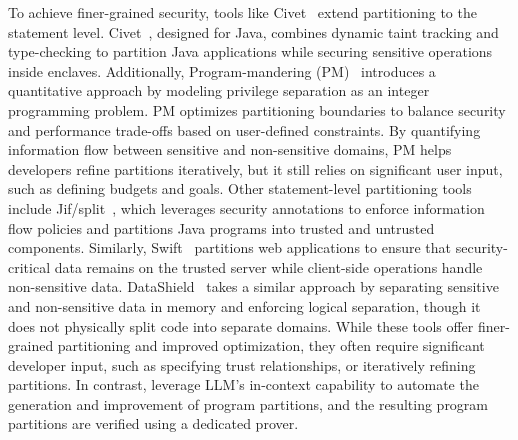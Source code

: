 To achieve finer-grained security, tools like Civet~\cite{tsai2020civet} extend partitioning to the statement level.
Civet~\cite{tsai2020civet}, designed for Java, combines dynamic taint tracking and type-checking to partition Java applications while securing sensitive operations inside enclaves. Additionally, Program-mandering (PM)~\cite{liu2019program} introduces a quantitative approach by modeling privilege separation as an integer programming problem. 
PM optimizes partitioning boundaries to balance security and performance trade-offs based on user-defined constraints. By quantifying information flow between sensitive and non-sensitive domains, PM helps developers refine partitions iteratively, but it still relies on significant user input, such as defining budgets and goals.
Other statement-level partitioning tools include Jif/split~\cite{zheng2003using}, which leverages security annotations to enforce information flow policies and partitions Java programs into trusted and untrusted components. 
Similarly, Swift~\cite{chong2007secure} partitions web applications to ensure that security-critical data remains on the trusted server while client-side operations handle non-sensitive data. DataShield~\cite{carr2017datashield} takes a similar approach by separating sensitive and non-sensitive data in memory and enforcing logical separation, though it does not physically split code into separate domains.
While these tools offer finer-grained partitioning and improved optimization, they often require significant developer input, such as specifying trust relationships, or iteratively refining partitions.
In contrast, \tool leverage LLM's in-context capability to automate the generation and improvement of program partitions, and the resulting program partitions are verified using a dedicated prover.

